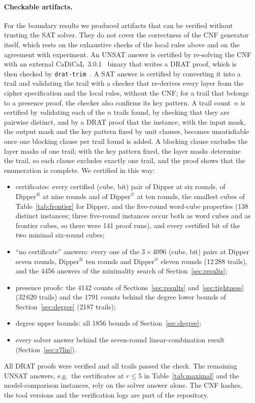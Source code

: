 \documentclass[11pt,a4paper]{article}
\theoremstyle{definition}
\theoremstyle{remark}
\newcommand{\NUNSAT}{138}
\newcommand{\NWIT}{12\,288}
\newcommand{\NPRTR}{32\,620}
\newcommand{\NDEGPR}{1791}
\newcommand{\NDEGTR}{2187}
\begin{document}
\paragraph{Checkable artifacts.} For the boundary results we produced artifacts that can be verified without trusting the SAT solver. They do not cover the correctness of the CNF generator itself, which rests on the exhaustive checks of the local rules above and on the agreement with experiment. An UNSAT answer is certified by re-solving the CNF with an external CaDiCaL~3.0.1~\cite{cadical2024} binary that writes a DRAT proof, which is then checked by \texttt{drat-trim}~\cite{drattrim2014}. A SAT answer is certified by converting it into a trail and validating the trail with a checker that re-derives every layer from the cipher specification and the local rules, without the CNF; for a trail that belongs to a presence proof, the checker also confirms its key pattern. A trail count~$n$ is certified by validating each of the $n$ trails found, by checking that they are pairwise distinct, and by a DRAT proof that the instance, with the input mask, the output mask and the key pattern fixed by unit clauses, becomes unsatisfiable once one blocking clause per trail found is added. A blocking clause excludes the layer masks of one trail; with the key pattern fixed, the layer masks determine the trail, so each clause excludes exactly one trail, and the proof shows that the enumeration is complete. We certified in this way:
\begin{itemize}
\item certificates: every certified (cube, bit) pair of Dipper at six rounds, of $\mathrm{Dipper}^{\oplus}$ at nine rounds and of $\mathrm{Dipper}^{\varnothing}$ at ten rounds, the smallest cubes of Table~\ref{tab:frontier} for Dipper, and the five-round word-cube properties (\NUNSAT{} distinct instances; three five-round instances occur both as word cubes and as frontier cubes, so there were 141 proof runs), and every certified bit of the two minimal six-round cubes;
\item ``no certificate'' answers: every one of the $3\times4096$ (cube, bit) pairs at Dipper seven rounds, $\mathrm{Dipper}^{\oplus}$ ten rounds and $\mathrm{Dipper}^{\varnothing}$ eleven rounds (\NWIT{} trails), and the 4456 answers of the minimality search of Section~\ref{sec:results};
\item presence proofs: the 4142 counts of Sections~\ref{sec:results} and~\ref{sec:tightness} (\NPRTR{} trails) and the \NDEGPR{} counts behind the degree lower bounds of Section~\ref{sec:degree} (\NDEGTR{} trails);
\item degree upper bounds: all 1856 bounds of Section~\ref{sec:degree};
\item every solver answer behind the seven-round linear-combination result (Section~\ref{sec:r7lin}).
\end{itemize}
All DRAT proofs were verified and all trails passed the check. The remaining UNSAT answers, e.g.\ the certificates at $r\le5$ in Table~\ref{tab:maximal} and the model-comparison instances, rely on the solver answer alone. The CNF hashes, the tool versions and the verification logs are part of the repository.
\end{document}
